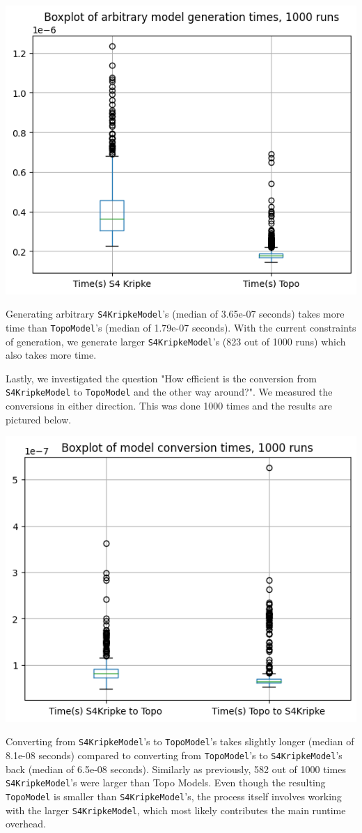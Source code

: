 \documentclass[12pt,a4paper]{article}
\begin{document}
\begin{center}
\includegraphics*[width=0.5\linewidth]{bench-model-generation.png}
\end{center}

Generating arbitrary \verb|S4KripkeModel|'s (median of 3.65e-07 seconds) takes more time than \verb|TopoModel|'s
(median of 1.79e-07 seconds). With the current constraints of generation, we generate larger
\verb|S4KripkeModel|'s (823 out of 1000 runs) which also takes more time.

Lastly, we investigated the question "How efficient is the conversion from \verb|S4KripkeModel| to \verb|TopoModel|
and the other way around?". We measured the conversions in either direction.
This was done 1000 times and the results are pictured below.

\begin{center}
\includegraphics*[width=0.5\linewidth]{bench-model-conversion.png}
\end{center}

Converting from \verb|S4KripkeModel|'s to \verb|TopoModel|'s takes slightly longer (median of 8.1e-08 seconds)
compared to converting from \verb|TopoModel|'s to \verb|S4KripkeModel|'s back (median of 6.5e-08 seconds).
Similarly as previously, 582 out of 1000 times \verb|S4KripkeModel|'s were larger than Topo Models.
Even though the resulting \verb|TopoModel| is smaller than \verb|S4KripkeModel|'s, the process itself involves
working with the larger \verb|S4KripkeModel|, which most likely contributes the main runtime overhead.
\end{document}
